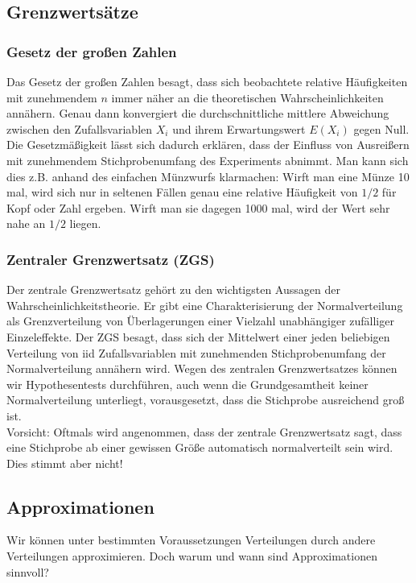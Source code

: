 \documentclass[a4paper]{article}
\newcommand\dangersign[1][2ex]{%
  \renewcommand\stacktype{L}%
  \scaleto{\stackon[1.3pt]{\color{red}$\triangle$}{\tiny !}}{#1}%
}
\begin{document}
\subsection{Grenzwertsätze}\label{sec:GWS}
\subsubsection{Gesetz der großen Zahlen}\label{sec:LLN}

Das Gesetz der großen Zahlen besagt, dass sich beobachtete relative Häufigkeiten mit zunehmendem $n$ immer näher an die theoretischen Wahrscheinlichkeiten annähern. Genau dann konvergiert die durchschnittliche mittlere Abweichung zwischen den Zufallsvariablen $X_i$ und ihrem Erwartungswert $E(X_i)$ gegen Null. Die Gesetzmäßigkeit lässt sich dadurch erklären, dass der Einfluss von Ausreißern mit zunehmendem Stichprobenumfang des Experiments abnimmt. Man kann sich dies z.B. anhand des einfachen Münzwurfs klarmachen: Wirft man eine Münze 10 mal, wird sich nur in seltenen Fällen genau eine relative Häufigkeit von $1/2$ für Kopf oder Zahl ergeben. Wirft man sie dagegen 1000 mal, wird der Wert sehr nahe an $1/2$ liegen. 


\subsubsection{Zentraler Grenzwertsatz (ZGS)}\label{sec:ZGS}
Der zentrale Grenzwertsatz gehört zu den wichtigsten Aussagen der Wahrscheinlichkeitstheorie. Er gibt eine Charakterisierung der Normalverteilung als Grenzverteilung von Überlagerungen einer Vielzahl unabhängiger zufälliger Einzeleffekte. Der ZGS besagt, dass sich der Mittelwert einer jeden beliebigen Verteilung von iid Zufallsvariablen mit zunehmenden Stichprobenumfang der Normalverteilung annähern wird. Wegen des zentralen Grenzwertsatzes können wir Hypothesentests durchführen, auch wenn die Grundgesamtheit keiner Normalverteilung unterliegt, vorausgesetzt, dass die Stichprobe ausreichend groß ist.\\

\noindent \dangersign[3ex] Vorsicht: Oftmals wird angenommen, dass der zentrale Grenzwertsatz sagt, dass eine Stichprobe ab einer gewissen Größe automatisch normalverteilt sein wird. Dies stimmt aber nicht!


\subsection{Approximationen}\label{sec:Approx}
Wir können unter bestimmten Voraussetzungen Verteilungen durch andere Verteilungen approximieren. Doch warum und wann sind Approximationen sinnvoll?
\end{document}
